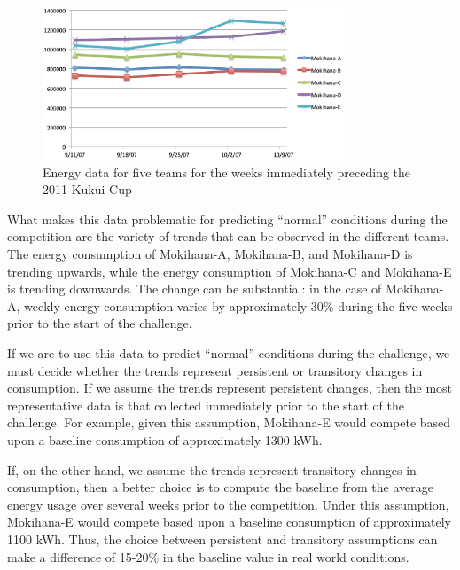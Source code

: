 \documentclass[jou]{apa} %
\begin{document}
\begin{figure}[htbp]
\begin{center}
\includegraphics[width=0.8\textwidth]{kc-baselines.2.eps}
\caption{Energy data for five teams for the weeks immediately preceding the 2011 Kukui Cup}
\label{fig:kukuicup-baseline-data-chart}
\end{center}
\end{figure}


What makes this data problematic for predicting ``normal'' conditions during the
competition are the variety of trends that can be observed in the different teams.  The
energy consumption of Mokihana-A, Mokihana-B, and Mokihana-D is trending upwards, while
the energy consumption of Mokihana-C and Mokihana-E is trending downwards.  The change can
be substantial: in the case of Mokihana-A, weekly energy consumption varies by
approximately 30\% during the five weeks prior to the start of the challenge.

If we are to use this data to predict ``normal'' conditions during the challenge, we must
decide whether the trends represent persistent or transitory changes in consumption.  If
we assume the trends represent persistent changes, then the most representative data is
that collected immediately prior to the start of the challenge.  For example, given this
assumption, Mokihana-E would compete based upon a baseline consumption of approximately 1300
kWh.

If, on the other hand, we assume the trends represent transitory changes in consumption,
then a better choice is to compute the baseline from the average energy usage over several
weeks prior to the competition.  Under this assumption, Mokihana-E would compete based
upon a baseline consumption of approximately 1100 kWh.  Thus, the choice between
persistent and transitory assumptions can make a difference of 15-20\% in the baseline value
in real world conditions.
\end{document}
